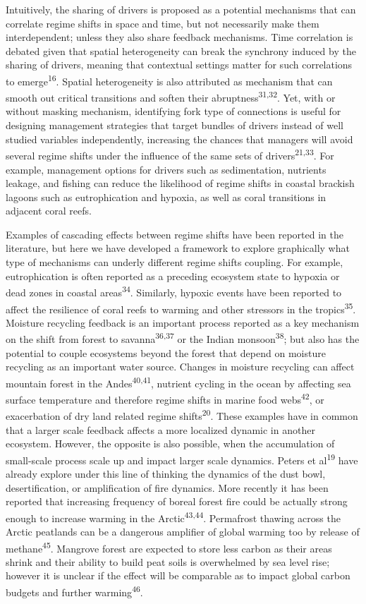 \documentclass[9pt,]{article}
\begin{document}
Intuitively, the sharing of drivers is proposed as a potential
mechanisms that can correlate regime shifts in space and time, but not
necessarily make them interdependent; unless they also share feedback
mechanisms. Time correlation is debated given that spatial heterogeneity
can break the synchrony induced by the sharing of drivers, meaning that
contextual settings matter for such correlations to
emerge\textsuperscript{16}. Spatial heterogeneity is also attributed as
mechanism that can smooth out critical transitions and soften their
abruptness\textsuperscript{31,32}. Yet, with or without masking
mechanism, identifying fork type of connections is useful for designing
management strategies that target bundles of drivers instead of well
studied variables independently, increasing the chances that managers
will avoid several regime shifts under the influence of the same sets of
drivers\textsuperscript{21,33}. For example, management options for
drivers such as sedimentation, nutrients leakage, and fishing can reduce
the likelihood of regime shifts in coastal brackish lagoons such as
eutrophication and hypoxia, as well as coral transitions in adjacent
coral reefs.

Examples of cascading effects between regime shifts have been reported
in the literature, but here we have developed a framework to explore
graphically what type of mechanisms can underly different regime shifts
coupling. For example, eutrophication is often reported as a preceding
ecosystem state to hypoxia or dead zones in coastal
areas\textsuperscript{34}. Similarly, hypoxic events have been reported
to affect the resilience of coral reefs to warming and other stressors
in the tropics\textsuperscript{35}. Moisture recycling feedback is an
important process reported as a key mechanism on the shift from forest
to savanna\textsuperscript{36,37} or the Indian
monsoon\textsuperscript{38}; but also has the potential to couple
ecosystems beyond the forest that depend on moisture recycling as an
important water source. Changes in moisture recycling can affect
mountain forest in the Andes\textsuperscript{40,41}, nutrient cycling in
the ocean by affecting sea surface temperature and therefore regime
shifts in marine food webs\textsuperscript{42}, or exacerbation of dry
land related regime shifts\textsuperscript{20}. These examples have in
common that a larger scale feedback affects a more localized dynamic in
another ecosystem. However, the opposite is also possible, when the
accumulation of small-scale process scale up and impact larger scale
dynamics. Peters et al\textsuperscript{19} have already explore under
this line of thinking the dynamics of the dust bowl, desertification, or
amplification of fire dynamics. More recently it has been reported that
increasing frequency of boreal forest fire could be actually strong
enough to increase warming in the Arctic\textsuperscript{43,44}.
Permafrost thawing across the Arctic peatlands can be a dangerous
amplifier of global warming too by release of
methane\textsuperscript{45}. Mangrove forest are expected to store less
carbon as their areas shrink and their ability to build peat soils is
overwhelmed by sea level rise; however it is unclear if the effect will
be comparable as to impact global carbon budgets and further
warming\textsuperscript{46}.
\end{document}
